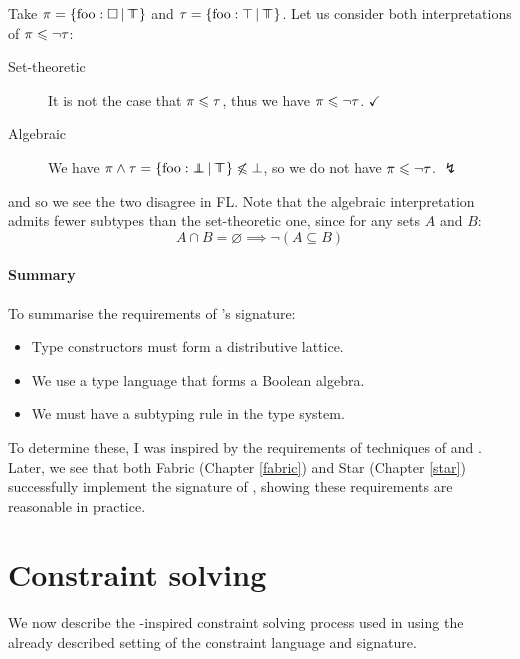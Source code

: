 \begin{example}
    Take $\pi = \flext{\mathrm{foo}: \flabsent }{\flftop}$ and $\tau = \flext{\mathrm{foo}: \top}{\flftop}$. Let us consider both interpretations of $\pi \leqslant \lnot \tau$: \begin{description}
        \item[Set-theoretic] It is not the case that $\pi \leqslant \tau$, thus we have $\pi \leqslant \lnot \tau$. $\checkmark$
        \item[Algebraic] We have $\pi \meet \tau = \flext{\mathrm{foo} : \flfbot }{\flftop} \not\sub \bot$, so we do not have $\pi \leqslant \lnot \tau$. $\lightning$
    \end{description}
    and so we see the two disagree in FL.
    Note that the algebraic interpretation admits fewer subtypes than the set-theoretic one, since for any sets $A$ and $B$: 
    $$A \cap B = \varnothing \implies \lnot(A \subseteq B)$$ 
\end{example}

\paragraph{Summary} To summarise the requirements of \inference{}'s signature: \begin{itemize}
    \item Type constructors must form a distributive lattice.
    \item We use a type language that forms a Boolean algebra.
    \item We must have a subtyping rule in the type system.
\end{itemize} 
To determine these, I was inspired by the requirements of techniques of \textcite{mlsub} and \textcite{mlstruct}.
Later, we see that both Fabric (Chapter \ref{fabric}) and Star (Chapter \ref{star}) successfully implement the signature of \inference{}, showing these requirements are reasonable in practice.

\section{Constraint solving}
\label{sec:constraints}

We now describe the \mlstruct{}-inspired constraint solving process used in \inference{} using the already described setting of the constraint language and signature. 

